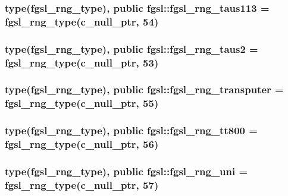 \hypertarget{classfgsl_a4b4cf5cdf021417e3147d6efff412544}{
\subsubsection[{fgsl\-\_\-rng\-\_\-taus113}]{\setlength{\rightskip}{0pt plus 5cm}type({\bf fgsl\-\_\-rng\-\_\-type}), public fgsl\-::fgsl\-\_\-rng\-\_\-taus113 = {\bf fgsl\-\_\-rng\-\_\-type}(c\-\_\-null\-\_\-ptr, 54)}}\label{classfgsl_a4b4cf5cdf021417e3147d6efff412544}
\hypertarget{classfgsl_a49b9837652787069b7179152078a6c9d}{
\subsubsection[{fgsl\-\_\-rng\-\_\-taus2}]{\setlength{\rightskip}{0pt plus 5cm}type({\bf fgsl\-\_\-rng\-\_\-type}), public fgsl\-::fgsl\-\_\-rng\-\_\-taus2 = {\bf fgsl\-\_\-rng\-\_\-type}(c\-\_\-null\-\_\-ptr, 53)}}\label{classfgsl_a49b9837652787069b7179152078a6c9d}
\hypertarget{classfgsl_ae6f6fd654d8c94d4ff5cf3a3eb274ccb}{
\subsubsection[{fgsl\-\_\-rng\-\_\-transputer}]{\setlength{\rightskip}{0pt plus 5cm}type({\bf fgsl\-\_\-rng\-\_\-type}), public fgsl\-::fgsl\-\_\-rng\-\_\-transputer = {\bf fgsl\-\_\-rng\-\_\-type}(c\-\_\-null\-\_\-ptr, 55)}}\label{classfgsl_ae6f6fd654d8c94d4ff5cf3a3eb274ccb}
\hypertarget{classfgsl_a1ec0bdbcac349e419b11ccb34d994e2d}{
\subsubsection[{fgsl\-\_\-rng\-\_\-tt800}]{\setlength{\rightskip}{0pt plus 5cm}type({\bf fgsl\-\_\-rng\-\_\-type}), public fgsl\-::fgsl\-\_\-rng\-\_\-tt800 = {\bf fgsl\-\_\-rng\-\_\-type}(c\-\_\-null\-\_\-ptr, 56)}}\label{classfgsl_a1ec0bdbcac349e419b11ccb34d994e2d}
\hypertarget{classfgsl_aaa640575921c58278aa5f851482cd072}{
\subsubsection[{fgsl\-\_\-rng\-\_\-uni}]{\setlength{\rightskip}{0pt plus 5cm}type({\bf fgsl\-\_\-rng\-\_\-type}), public fgsl\-::fgsl\-\_\-rng\-\_\-uni = {\bf fgsl\-\_\-rng\-\_\-type}(c\-\_\-null\-\_\-ptr, 57)}}\label{classfgsl_aaa640575921c58278aa5f851482cd072}
